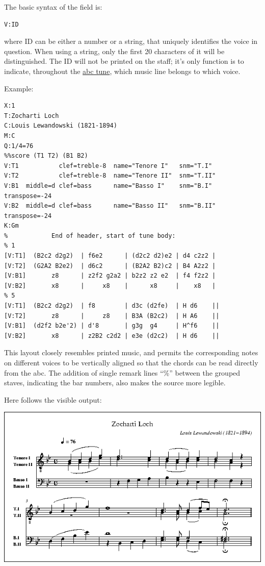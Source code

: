 \documentclass[oneside]{book}
\begin{document}
The basic syntax of the field is:

\begin{verbatim}
V:ID
\end{verbatim}

where ID can be either a number or a string, that uniquely identifies
the voice in question. When using a string, only the first 20 characters
of it will be distinguished. The ID will not be printed on the staff;
it's only function is to indicate, throughout the
\protect\hyperlink{abc_tune_definition}{abc tune}, which music line
belongs to which voice.

Example:

\begin{verbatim}
X:1
T:Zocharti Loch
C:Louis Lewandowski (1821-1894)
M:C
Q:1/4=76
%%score (T1 T2) (B1 B2)
V:T1           clef=treble-8  name="Tenore I"   snm="T.I"
V:T2           clef=treble-8  name="Tenore II"  snm="T.II"
V:B1  middle=d clef=bass      name="Basso I"    snm="B.I"  transpose=-24
V:B2  middle=d clef=bass      name="Basso II"   snm="B.II" transpose=-24
K:Gm
%            End of header, start of tune body:
% 1
[V:T1]  (B2c2 d2g2)  | f6e2      | (d2c2 d2)e2 | d4 c2z2 |
[V:T2]  (G2A2 B2e2)  | d6c2      | (B2A2 B2)c2 | B4 A2z2 |
[V:B1]       z8      | z2f2 g2a2 | b2z2 z2 e2  | f4 f2z2 |
[V:B2]       x8      |     x8    |      x8     |    x8   |
% 5
[V:T1]  (B2c2 d2g2)  | f8        | d3c (d2fe)  | H d6    ||
[V:T2]       z8      |     z8    | B3A (B2c2)  | H A6    ||
[V:B1]  (d2f2 b2e'2) | d'8       | g3g  g4     | H^f6    ||
[V:B2]       x8      | z2B2 c2d2 | e3e (d2c2)  | H d6    ||
\end{verbatim}

This layout closely resembles printed music, and permits the
corresponding notes on different voices to be vertically aligned so that
the chords can be read directly from the abc. The addition of single
remark lines ``\%'' between the grouped staves, indicating the bar
numbers, also makes the source more legible.

Here follows the visible output:

\href{/wiki/_detail/abc:standard:multivoice-80.png?id=abc\%3Astandard\%3Av2.1}{\includegraphics{wiki/_media/abc-standard-multivoice-80.png}}
\end{document}
